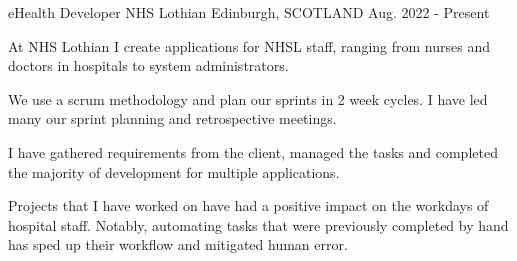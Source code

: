 \begin{cventries}
  \cventry
    {eHealth Developer} %
    {NHS Lothian} %
    {Edinburgh, SCOTLAND} %
    {Aug. 2022 - Present} %
    {
      \color{awesome}              \color{graytext}
      \vspace{1.6em}
      \begin{cvitems} %
        \item At NHS Lothian I create applications for NHSL staff, ranging from nurses and doctors in hospitals to system administrators.
        \item We use a scrum methodology and plan our sprints in 2 week cycles. I have led many our sprint planning and retrospective meetings.
        \item I have gathered requirements from the client, managed the tasks and completed the majority of development for multiple applications.
        \item Projects that I have worked on have had a positive impact on the workdays of hospital staff. Notably, automating tasks that were previously completed by hand has sped up their workflow and mitigated human error.
      \end{cvitems}
    }
\end{cventries}
